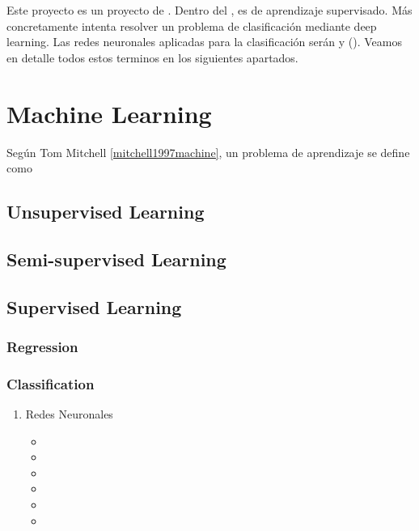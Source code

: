 

Este proyecto es un proyecto de . Dentro del , es de aprendizaje supervisado. Más concretamente intenta resolver un problema de clasificación mediante deep learning. Las redes neuronales aplicadas para la clasificación serán  y  (). Veamos en detalle todos estos terminos en los siguientes apartados.

\section{Machine Learning}

Según Tom Mitchell \ref{mitchell1997machine}, un problema de aprendizaje se define como 

\subsection{Unsupervised Learning}

\subsection{Semi-supervised Learning}

\subsection{Supervised Learning}

\subsubsection{Regression}

\subsubsection{Classification}

\begin{enumerate}
  \item Redes Neuronales

        \begin{itemize}
          \item {}
          \item {}
          \item {}
          \item {}
          \item {}
          \item {}
        \end{itemize}

\end{enumerate}

